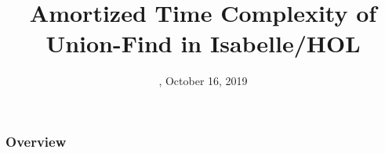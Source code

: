 

                    

\newcommand{\Rplus}{\protect\hspace{-.1em}\protect\raisebox{.35ex}{\smaller{\smaller\textbf{+}}}}
\newcommand{\Cpp}{\mbox{C\Rplus\Rplus}\xspace}
\newcommand{\CppTw}{\mbox{C\Rplus\Rplus 20}\xspace}

\newcommand{\Datum}{\today}

\renewcommand{\PraesentationFusszeileZusatz}{| Amortized Time Complexity of Union-Find in Isabelle/HOL}

\title{Amortized Time Complexity of Union-Find in Isabelle/HOL \newline {}}
\author{\PersonTitel{} \PersonVorname{} \PersonNachname}
\date[\Datum]{\PersonStadt, October 16, 2019}
\subject{Amortized Time Complexity of Union-Find in Isabelle/HOL}


 



\PraesentationMasterKopfzeileDreizeiler

\PraesentationStartseiteUhrenturm
\PraesentationTitelseite %

\begin{frame}
	\frametitle{Overview}
	\vspace{1cm}
	\begin{minipage}[s]{\textwidth}
	\tableofcontents
	\end{minipage}
\end{frame}

